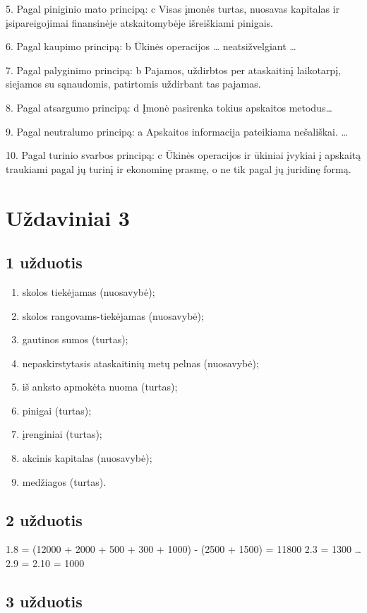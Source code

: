5. Pagal piniginio mato principą:
c Visas įmonės turtas, nuosavas kapitalas ir įsipareigojimai
finansinėje atskaitomybėje išreiškiami pinigais.

6. Pagal kaupimo principą:
b Ūkinės operacijos … neatsižvelgiant …

7. Pagal palyginimo principą:
b Pajamos, uždirbtos per ataskaitinį laikotarpį, siejamos su
sąnaudomis, patirtomis uždirbant tas pajamas.

8. Pagal atsargumo principą:
d Įmonė pasirenka tokius apskaitos metodus…

9. Pagal neutralumo principą:
a Apskaitos informacija pateikiama nešališkai. …

10. Pagal turinio svarbos principą:
c Ūkinės operacijos ir ūkiniai įvykiai į apskaitą traukiami pagal jų
turinį ir ekonominę prasmę, o ne tik pagal jų juridinę formą.

\chapter{Uždaviniai 3}

\section{1 užduotis}

\begin{enumerate}
  \item skolos tiekėjamas (nuosavybė);
  \item skolos rangovams-tiekėjamas (nuosavybė);
  \item gautinos sumos (turtas);
  \item nepaskirstytasis ataskaitinių metų pelnas (nuosavybė);
  \item iš anksto apmokėta nuoma (turtas);
  \item pinigai (turtas);
  \item įrenginiai (turtas);
  \item akcinis kapitalas (nuosavybė);
  \item medžiagos (turtas).
\end{enumerate}

\section{2 užduotis}

1.8 = (12000 + 2000 + 500 + 300 + 1000) - (2500 + 1500) = 11800
2.3 = 1300
…
2.9 = 2.10 = 1000

\section{3 užduotis}

